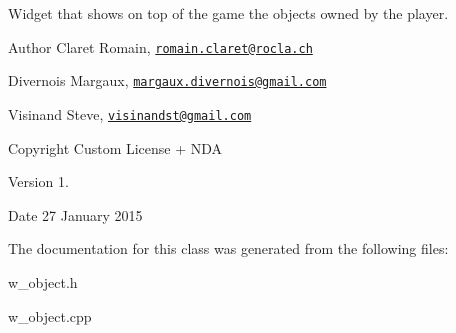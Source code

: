Widget that shows on top of the game the objects owned by the player. \begin{DoxyAuthor}{Author}
Claret Romain, \href{mailto:romain.claret@rocla.ch}{\tt romain.\+claret@rocla.\+ch} 

Divernois Margaux, \href{mailto:margaux.divernois@gmail.com}{\tt margaux.\+divernois@gmail.\+com} 

Visinand Steve, \href{mailto:visinandst@gmail.com}{\tt visinandst@gmail.\+com} 
\end{DoxyAuthor}
\begin{DoxyCopyright}{Copyright}
Custom License + N\+D\+A 
\end{DoxyCopyright}
\begin{DoxyVersion}{Version}
1. 
\end{DoxyVersion}
\begin{DoxyDate}{Date}
27 January 2015 
\end{DoxyDate}


The documentation for this class was generated from the following files\+:\begin{DoxyCompactItemize}
\item 
w\+\_\+object.\+h\item 
w\+\_\+object.\+cpp\end{DoxyCompactItemize}
